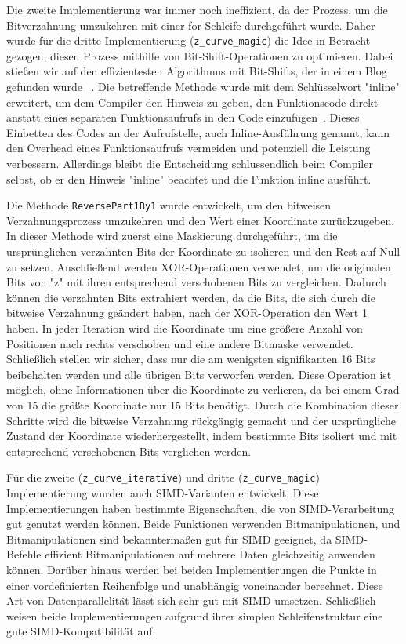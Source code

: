 \documentclass[course=erap]{aspdoc}
\begin{document}
\noindent Die zweite Implementierung war immer noch ineffizient, da der Prozess, um die Bitverzahnung umzukehren mit einer for-Schleife durchgeführt wurde. Daher wurde für die dritte Implementierung (\texttt{z\_curve\_magic}) die Idee in Betracht gezogen, diesen Prozess mithilfe von Bit-Shift-Operationen zu optimieren. Dabei stießen wir auf den effizientesten Algorithmus mit Bit-Shifts, der in einem Blog gefunden wurde ~\cite{morton-codes}. Die betreffende Methode wurde mit dem Schlüsselwort "inline" erweitert, um dem Compiler den Hinweis zu geben, den Funktionscode direkt anstatt eines separaten Funktionsaufrufs in den Code einzufügen~\cite{wolf}. Dieses Einbetten des Codes an der Aufrufstelle, auch Inline-Ausführung genannt, kann den Overhead eines Funktionsaufrufs vermeiden und potenziell die Leistung verbessern. Allerdings bleibt die Entscheidung schlussendlich beim Compiler selbst, ob er den Hinweis "inline" beachtet und die Funktion inline ausführt.

\noindent Die Methode \texttt{ReversePart1By1} wurde entwickelt, um den bitweisen Verzahnungsprozess umzukehren und den Wert einer Koordinate zurückzugeben. In dieser Methode wird zuerst eine Maskierung durchgeführt, um die ursprünglichen verzahnten Bits der Koordinate zu isolieren und den Rest auf Null zu setzen. Anschließend werden XOR-Operationen verwendet, um die originalen Bits von "z" mit ihren entsprechend verschobenen Bits zu vergleichen. Dadurch können die verzahnten Bits extrahiert werden, da die Bits, die sich durch die bitweise Verzahnung geändert haben, nach der XOR-Operation den Wert 1 haben. In jeder Iteration wird die Koordinate um eine größere Anzahl von Positionen nach rechts verschoben und eine andere Bitmaske verwendet. Schließlich stellen wir sicher, dass nur die am wenigsten signifikanten 16 Bits beibehalten werden und alle übrigen Bits verworfen werden. Diese Operation ist möglich, ohne Informationen über die Koordinate zu verlieren, da bei einem Grad von 15 die größte Koordinate nur 15 Bits benötigt. Durch die Kombination dieser Schritte wird die bitweise Verzahnung rückgängig gemacht und der ursprüngliche Zustand der Koordinate wiederhergestellt, indem bestimmte Bits isoliert und mit entsprechend verschobenen Bits verglichen werden.

\noindent Für die zweite (\texttt{z\_curve\_iterative}) und dritte (\texttt{z\_curve\_magic}) Implementierung wurden auch SIMD-Varianten entwickelt. Diese Implementierungen haben bestimmte Eigenschaften, die von SIMD-Verarbeitung gut genutzt werden können. Beide Funktionen verwenden Bitmanipulationen, und Bitmanipulationen sind bekanntermaßen gut für SIMD geeignet, da SIMD-Befehle effizient Bitmanipulationen auf mehrere Daten gleichzeitig anwenden können. Darüber hinaus werden bei beiden Implementierungen die Punkte in einer vordefinierten Reihenfolge und unabhängig voneinander berechnet. Diese Art von Datenparallelität lässt sich sehr gut mit SIMD umsetzen. Schließlich weisen beide Implementierungen aufgrund ihrer simplen Schleifenstruktur eine gute SIMD-Kompatibilität auf.
\end{document}
